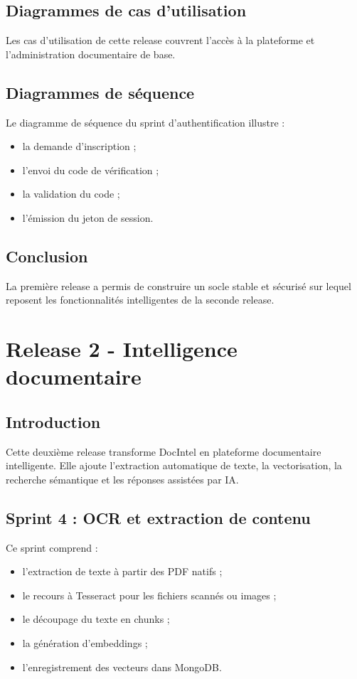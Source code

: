 \documentclass[12pt,a4paper]{report}
\begin{document}
\section{Diagrammes de cas d'utilisation}
Les cas d'utilisation de cette release couvrent l'accès à la plateforme et l'administration documentaire de base.

\section{Diagrammes de séquence}
Le diagramme de séquence du sprint d'authentification illustre :
\begin{itemize}
  \item la demande d'inscription ;
  \item l'envoi du code de vérification ;
  \item la validation du code ;
  \item l'émission du jeton de session.
\end{itemize}

\section{Conclusion}
La première release a permis de construire un socle stable et sécurisé sur lequel reposent les fonctionnalités intelligentes de la seconde release.

\chapter{Release 2 - Intelligence documentaire}

\section{Introduction}
Cette deuxième release transforme DocIntel en plateforme documentaire intelligente. Elle ajoute l'extraction automatique de texte, la vectorisation, la recherche sémantique et les réponses assistées par IA.

\section{Sprint 4 : OCR et extraction de contenu}
Ce sprint comprend :
\begin{itemize}
  \item l'extraction de texte à partir des PDF natifs ;
  \item le recours à Tesseract pour les fichiers scannés ou images ;
  \item le découpage du texte en chunks ;
  \item la génération d'embeddings ;
  \item l'enregistrement des vecteurs dans MongoDB.
\end{itemize}
\end{document}
